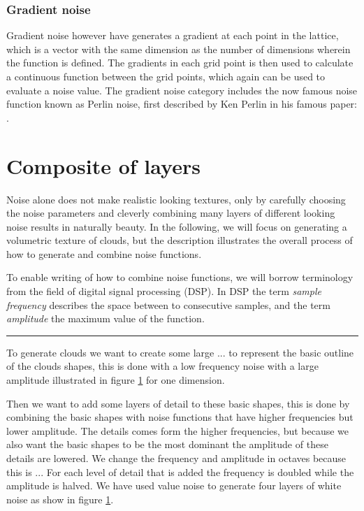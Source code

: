 \subsubsection{Gradient noise}
Gradient noise however have generates a gradient at each point in the
lattice, which is a vector with the same dimension as the number of
dimensions wherein the function is defined. The gradients in each grid
point is then used to calculate a continuous function between the grid
points, which again can be used to evaluate a noise value.
%
The gradient noise category includes the now famous noise
function known as Perlin noise, first described by Ken Perlin in
his famous paper: .

\section{Composite of layers}
Noise alone does not make realistic looking textures, only by carefully
choosing the noise parameters and cleverly combining many layers of
different looking noise results in naturally beauty. In the following,
we will focus on generating a volumetric texture of clouds, but the
description illustrates the overall process of how to generate and
combine noise functions.

To enable writing of how to combine noise functions, we will borrow
terminology from the field of digital signal processing (DSP).
In DSP the term \emph{sample frequency}
describes the space between to consecutive samples, and the term
\emph{amplitude} the maximum value of the function.

\hrule

To generate clouds we want to create some large ... to represent the
basic outline of the clouds shapes, this is done with a low frequency noise
with a large amplitude illustrated in figure \ref{} for one dimension.

Then we want to add some layers of detail to these basic shapes, this
is done by combining the basic shapes with noise functions that have
higher frequencies but lower amplitude. The details comes form the
higher frequencies, but because we also want the basic shapes to be
the most dominant the amplitude of these details are lowered. We
change the frequency and amplitude in octaves because this is ...
For each level of detail that is added the frequency is doubled while
the amplitude is halved. We have used value noise to generate four
layers of white noise as show in figure \ref{}.

